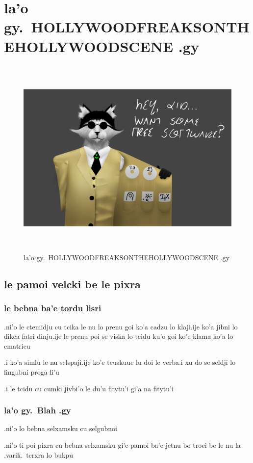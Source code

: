 \documentclass{report}
\newcommand\imageheight{10cm}
\begin{document}
\chapter{la'o gy.\ HOLLYWOODFREAKSONTHEHOLLYWOODSCENE .gy}
\begin{figure}[ht]
	\centering
	\includegraphics[height=\imageheight]{hollywoodfreaksonthehollywoodscene/hollywoodfreaksonthehollywoodscene.png}
	\caption[center]{la'o gy.\ HOLLYWOODFREAKSONTHEHOLLYWOODSCENE .gy}
\end{figure}
\section{le pamoi velcki be le pixra}
\subsection{le bebna ba'e tordu lisri}
.ni'o le ctemidju cu tcika le nu lo prenu goi ko'a cadzu lo klaji\@  .ije ko'a jibni lo dikca fatri dinju\@  .ije le prenu poi se viska lo tcidu ku'o goi ko'e klama ko'a lo cmatricu

.i ko'a simlu le nu selspaji\@  .ije ko'e tcuskuue lu doi le verba\@  .i xu do se seldji lo fingubni proga li'u

.i le tcidu cu cumki jivbi'o le du'u fitytu'i gi'a na fitytu'i

\subsection{la'o gy.\ Blah .gy}
.ni'o lo bebna selxamsku cu selgubnoi

.ni'o ti poi pixra cu bebna selxamsku gi'e pamoi ba'e jetnu bo troci be le nu la .varik.\ terxra lo bukpu
\end{document}
